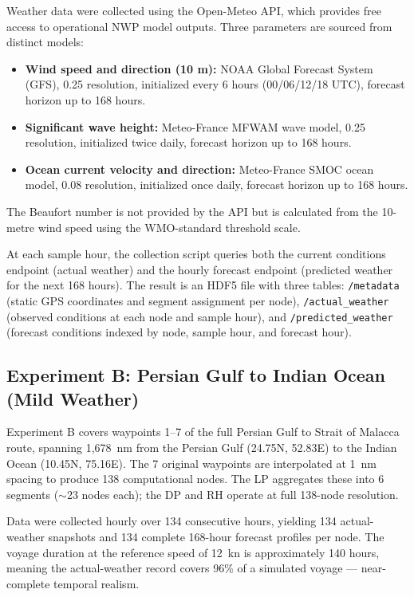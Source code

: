 \documentclass[review]{elsarticle}
\begin{document}
Weather data were collected using the Open-Meteo API, which provides free access to operational NWP model outputs. Three parameters are sourced from distinct models:

\begin{itemize}
    \item \textbf{Wind speed and direction (10 m):} NOAA Global Forecast System (GFS), 0.25\degree{} resolution, initialized every 6 hours (00/06/12/18 UTC), forecast horizon up to 168 hours.
    \item \textbf{Significant wave height:} Meteo-France MFWAM wave model, 0.25\degree{} resolution, initialized twice daily, forecast horizon up to 168 hours.
    \item \textbf{Ocean current velocity and direction:} Meteo-France SMOC ocean model, 0.08\degree{} resolution, initialized once daily, forecast horizon up to 168 hours.
\end{itemize}

The Beaufort number is not provided by the API but is calculated from the 10-metre wind speed using the WMO-standard threshold scale.

At each sample hour, the collection script queries both the current conditions endpoint (actual weather) and the hourly forecast endpoint (predicted weather for the next 168 hours). The result is an HDF5 file with three tables: \texttt{/metadata} (static GPS coordinates and segment assignment per node), \texttt{/actual\_weather} (observed conditions at each node and sample hour), and \texttt{/predicted\_weather} (forecast conditions indexed by node, sample hour, and forecast hour).

\subsection{Experiment B: Persian Gulf to Indian Ocean (Mild Weather)}
\label{sec:exp-b}

Experiment B covers waypoints 1--7 of the full Persian Gulf to Strait of Malacca route, spanning 1,678~nm from the Persian Gulf (24.75\degree{}N, 52.83\degree{}E) to the Indian Ocean (10.45\degree{}N, 75.16\degree{}E). The 7 original waypoints are interpolated at 1~nm spacing to produce 138 computational nodes. The LP aggregates these into 6 segments ($\sim$23 nodes each); the DP and RH operate at full 138-node resolution.

Data were collected hourly over 134 consecutive hours, yielding 134 actual-weather snapshots and 134 complete 168-hour forecast profiles per node. The voyage duration at the reference speed of 12~kn is approximately 140 hours, meaning the actual-weather record covers 96\% of a simulated voyage --- near-complete temporal realism.
\end{document}
